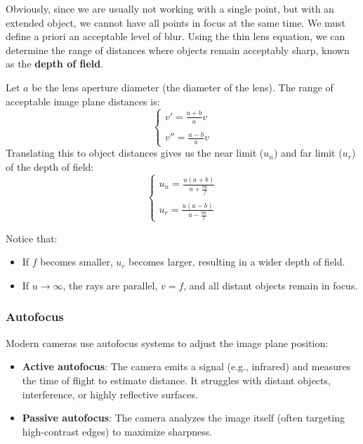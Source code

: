 Obviously, since we are usually not working with a single point, but with an extended object, we cannot have all points in focus at the same time.
We must define a priori an acceptable level of blur. Using the thin lens equation, we can determine the range of distances where objects remain acceptably sharp, 
known as the \textbf{depth of field}.

Let $a$ be the lens aperture diameter (the diameter of the lens). The range of acceptable image plane distances is:
\begin{equation*}
    \begin{cases}
        v' = \frac{a + b}{a} v  \\\\
        v'' = \frac{a - b}{a} v
    \end{cases}
\end{equation*}
Translating this to object distances gives us the near limit ($u_n$) and far limit ($u_r$) of the depth of field:
\begin{equation*}
    \begin{cases}
        u_n = \frac{u(a+b)}{a+ \frac{bu}{f}} \\\\
        u_r = \frac{u(a-b)}{a- \frac{bu}{f}}
    \end{cases}
\end{equation*}

Notice that:
\begin{itemize}
    \item If $f$ becomes smaller, $u_r$ becomes larger, resulting in a wider depth of field.
    \item If $u \rightarrow \infty$, the rays are parallel, $v = f$, and all distant objects remain in focus.
\end{itemize}

\subsubsection{Autofocus}
Modern cameras use autofocus systems to adjust the image plane position:
\begin{itemize}
    \item \textbf{Active autofocus}: The camera emits a signal (e.g., infrared) and measures the time of flight to estimate distance. It struggles with distant objects, interference, or highly reflective surfaces.
    \item \textbf{Passive autofocus}: The camera analyzes the image itself (often targeting high-contrast edges) to maximize sharpness. 
\end{itemize}

